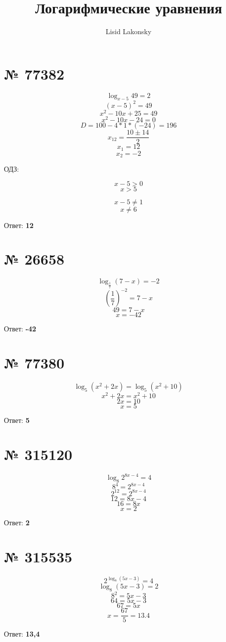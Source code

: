 \documentclass[11pt]{article} %
\title{Логарифмические уравнения}
\author{Lisid Lakonsky}
\begin{document}
\maketitle

\section{№ \textbf{77382}}

$$\log_{x - 5}49 = 2$$
$$(x-5)^2 = 49$$
$$x^2 - 10x + 25 = 49$$
$$x^2 - 10x - 24 = 0$$
$$D = 100 - 4 * 1 * (-24) = 196$$
$$x_{12} = \frac{10 \pm 14}{2}$$
$$x_1 = 12$$
$$x_2 = -2$$

ОДЗ:

$$x - 5 > 0$$
$$x > 5$$

$$x - 5 \neq 1$$
$$x \neq 6$$

Ответ: \textbf{12}

\section{№ \textbf{26658}}

$$\log_{\frac{1}{7}}(7 - x) = -2$$
$$(\frac{1}{7})^{-2} = 7 - x$$
$$49 = 7 - x$$
$$x = -42$$

Ответ: \textbf{-42}

\section{№ \textbf{77380}}

$$\log_5(x^2 + 2x) = \log_5(x^2 + 10)$$
$$x^2 + 2x = x^2 + 10$$
$$2x = 10$$
$$x = 5$$

Ответ: \textbf{5}

\section{№ \textbf{315120}}

$$\log_{8}2^{8x - 4} = 4$$
$$8^4 = 2^{8x - 4}$$
$$2^12 = 2^{8x - 4}$$
$$12 = 8x - 4$$
$$16 = 8x$$
$$x = 2$$

Ответ: \textbf{2}

\section{№ \textbf{315535}}

$$2^{\log_8(5x - 3)} = 4$$
$$\log_8(5x - 3) = 2$$
$$8^2 = 5x - 3$$
$$64 = 5x - 3$$
$$67 = 5x$$
$$x = \frac{67}{5} = 13.4$$

Ответ: \textbf{13,4}
\end{document}
